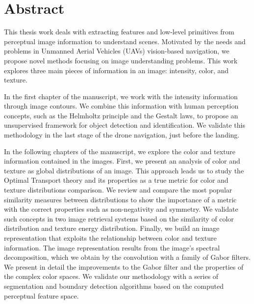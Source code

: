 \chapter*{Abstract}

\noindent This thesis work deals with extracting features and low-level primitives from perceptual image information to understand scenes. Motivated by the needs and problems in Unmanned Aerial Vehicles (UAVs) vision-based navigation, we propose novel methods focusing on image understanding problems. This work explores three main pieces of information in an image: intensity, color, and texture.
\newline 

\noindent In the first chapter of the manuscript, we work with the intensity information through image contours. We combine this information with human perception concepts, such as the Helmholtz principle and the Gestalt laws, to propose an unsupervised framework for object detection and identification. We validate this methodology in the last stage of the drone navigation, just before the landing. 
\newline

\noindent In the following chapters of the manuscript, we explore the color and texture information contained in the images. First, we present an analysis of color and texture as global distributions of an image. This approach leads us to study the Optimal Transport theory and its properties as a true metric for color and texture distributions comparison. We review and compare the most popular similarity measures between distributions to show the importance of a metric with the correct properties such as non-negativity and symmetry. We validate such concepts in two image retrieval systems based on the similarity of color distribution and texture energy distribution. 
\noindent Finally, we build an image representation that exploits the relationship between color and texture information. The image representation results from the image's spectral decomposition, which we obtain by the convolution with a family of Gabor filters. We present in detail the improvements to the Gabor filter and the properties of the complex color spaces. We validate our methodology with a series of segmentation and boundary detection algorithms based on the computed perceptual feature space.

